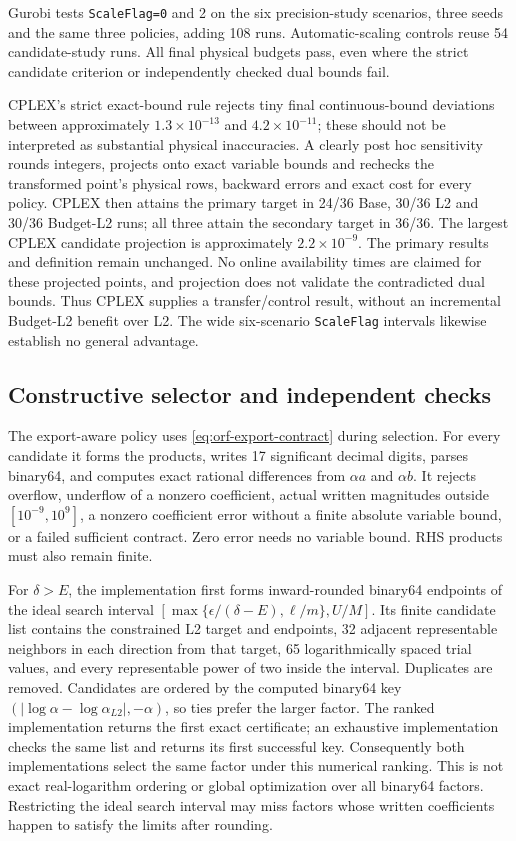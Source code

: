 Gurobi tests \texttt{ScaleFlag=0} and 2 on the six precision-study scenarios,
three seeds and the same three policies, adding 108 runs. Automatic-scaling
controls reuse 54 candidate-study runs. All final physical budgets pass, even
where the strict candidate criterion or independently checked dual bounds fail.

CPLEX's strict exact-bound rule rejects tiny final continuous-bound deviations
between approximately $1.3\times10^{-13}$ and $4.2\times10^{-11}$; these should
not be interpreted as substantial physical inaccuracies. A clearly post hoc
sensitivity rounds integers, projects onto exact variable bounds and rechecks
the transformed point's physical rows, backward errors and exact cost for every
policy. CPLEX then attains the primary target in 24/36 Base, 30/36 L2 and 30/36
Budget-L2 runs; all three attain the secondary target in 36/36. The largest
CPLEX candidate projection is approximately $2.2\times10^{-9}$.
The primary results and definition remain unchanged. No online availability
times are claimed for these projected points, and projection does not validate
the contradicted dual bounds. Thus CPLEX supplies a transfer/control result,
without an incremental Budget-L2 benefit over L2. The wide six-scenario
\texttt{ScaleFlag} intervals likewise establish no general advantage.

\subsection{Constructive selector and independent checks}
The export-aware policy uses \eqref{eq:orf-export-contract} during selection.
For every candidate it forms the products, writes 17 significant decimal
digits, parses binary64, and computes exact rational differences from $\alpha a$
and $\alpha b$. It rejects overflow, underflow of a nonzero coefficient, actual
written magnitudes outside $[10^{-9},10^9]$, a nonzero coefficient error without
a finite absolute variable bound, or a failed sufficient contract. Zero error
needs no variable bound. RHS products must also remain finite.

For $\delta>E$, the implementation first forms inward-rounded binary64
endpoints of the ideal search interval
$[\max\{\epsilon/(\delta-E),\ell/m\},U/M]$.
Its finite candidate list contains the constrained L2 target and endpoints,
32 adjacent representable neighbors in each direction from that target,
65 logarithmically spaced trial values, and every representable power of two
inside the interval. Duplicates are removed. Candidates are ordered by the
computed binary64 key
$(|\log\alpha-\log\alpha_{L2}|,-\alpha)$, so ties prefer the larger factor.
The ranked implementation returns the first exact certificate; an exhaustive
implementation checks the same list and returns its first successful key.
Consequently both implementations select the same factor under this numerical
ranking. This is not exact real-logarithm ordering or global optimization over
all binary64 factors. Restricting the ideal search interval may miss factors
whose written coefficients happen to satisfy the limits after rounding.

